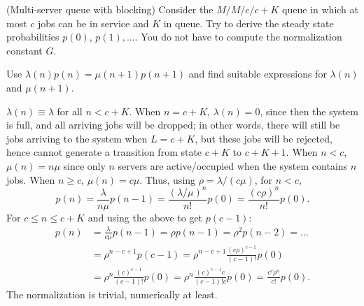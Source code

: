 \begin{exercise}{\faFlask}(Multi-server queue with blocking) Consider the
  $M/M/c/c+K$ queue in which at most $c$ jobs can be in service and $K$ in queue. Try to derive the steady state probabilities
  $p(0)$, $p(1), \ldots$. You do not have to compute the normalization
  constant $G$. 
  \begin{hint}
Use $\lambda(n) p(n) = \mu(n+1)p(n+1)$ and
    find suitable expressions for $\lambda(n)$ and $\mu(n+1)$. 
  \end{hint}
  \begin{solution}
    $\lambda(n) \equiv \lambda$ for all $n<c+K$. When $n=c+K$,
    $\lambda(n)=0$, since then the system is full, and all arriving
    jobs will be dropped; in other words, there will still be jobs
    arriving to the system when $L=c+K$, but these jobs will be
    rejected, hence cannot generate a transition from state $c+K$ to
    $c+K+1$.  When $n<c$, $\mu(n)=n \mu$ since only $n$ servers
    are active/occupied when the system contains $n$ jobs. When
    $n\geq c$, $\mu(n) = c \mu$. Thus, using $\rho=\lambda/(c\mu)$, for $n<c$,
     \begin{equation*}
      p(n) = \frac{\lambda}{n\mu} p(n-1) = \frac{(\lambda/\mu)^n}{n!} p(0)=\frac{(c\rho)^n}{n!}p(0).
     \end{equation*}
For $c\leq n\leq c+K$ and using the above to get $p(c-1)$:
 \begin{align*}
 p(n) &= \frac{\lambda}{c\mu} p(n-1) 
= \rho p(n-1) = \rho^2 p(n-2) = \ldots\\
&=\rho^{n-c+1} p(c-1) 
=\rho^{n-c+1} \frac{(c\rho)^{c-1}}{(c-1)!}p(0)\\
&=\rho^{n} \frac{(c)^{c-1}}{(c-1)!}p(0) 
=\rho^{n} \frac{(c)^{c-1}c}{(c-1)!c}p(0) =\frac{c^c \rho^n}{c!} p(0).
 \end{align*}
The normalization is trivial, numerically at least.
  \end{solution}
\end{exercise}


